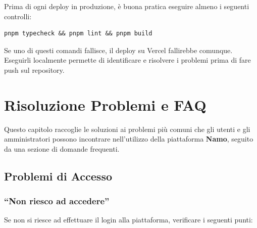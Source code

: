 \documentclass[a4paper,11pt,oneside]{book}
\newcommand{\namo}{\textbf{Namo}}
\begin{document}
\begin{tipbox}
Prima di ogni deploy in produzione, \`e buona pratica eseguire almeno i seguenti controlli:
\begin{verbatim}
pnpm typecheck && pnpm lint && pnpm build
\end{verbatim}
Se uno di questi comandi fallisce, il deploy su Vercel fallirebbe comunque. Eseguirli localmente permette di identificare e risolvere i problemi prima di fare push sul repository.
\end{tipbox}


\chapter{Risoluzione Problemi e FAQ}
\label{ch:risoluzione-problemi}

Questo capitolo raccoglie le soluzioni ai problemi pi\`u comuni che gli utenti e gli amministratori possono incontrare nell'utilizzo della piattaforma \namo{}, seguito da una sezione di domande frequenti.

\section{Problemi di Accesso}
\label{sec:problemi-accesso}

\subsection{``Non riesco ad accedere''}

Se non si riesce ad effettuare il login alla piattaforma, verificare i seguenti punti:
\end{document}
